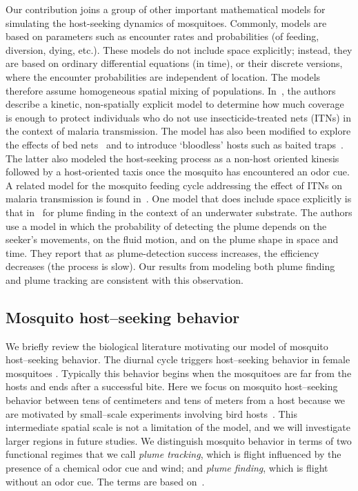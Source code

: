 \documentclass[10pt]{article}
\begin{document}
Our contribution joins a group of other important mathematical models for simulating the host-seeking dynamics of mosquitoes.  Commonly, models are based on parameters such as encounter rates and probabilities (of feeding, diversion, dying, etc.).  These models do not include space explicitly; instead, they are based on ordinary differential equations (in time), or their discrete versions, where the encounter probabilities are independent of location. The models therefore assume homogeneous spatial mixing of populations.
%
In~\cite{KilleenEtAl2007}, the authors describe a kinetic, non-spatially explicit model to determine how much coverage is enough to protect individuals who do not use insecticide-treated nets (ITNs) in the context of malaria transmission.  The model has also been modified to explore the effects of bed nets~\cite{Killeen2007} and to introduce `bloodless' hosts such as baited traps~\cite{OkumuModel2010}.  The latter also modeled the host-seeking process as a non-host oriented kinesis followed by a host-oriented taxis once the mosquito has encountered an odor cue.  A related model for the mosquito feeding cycle addressing the effect of ITNs on malaria transmission is found in~\cite{LeMenach}.   One model that does include space explicitly is that in~\cite{Pasternak2009} for plume finding in the context of an underwater substrate.  The authors use a model in which the probability of detecting the plume depends on the seeker's movements, on the fluid motion, and on the plume shape in space and time. They report that as plume-detection success increases, the efficiency decreases (the process is slow).  Our results from modeling both plume finding and plume tracking are consistent with this observation.

\subsection*{Mosquito host--seeking behavior}\label{sec:mosqbehav}
We briefly review the biological literature motivating our model of mosquito host--seeking behavior. The diurnal cycle triggers host--seeking behavior in female mosquitoes \cite{Gibson1999}. Typically this behavior begins when the mosquitoes are far from the hosts and ends after a successful bite.  Here we focus on mosquito host--seeking behavior between tens of centimeters and tens of meters from a host because we are motivated by small--scale experiments involving bird hosts~\cite{Foppa2011}.  
This intermediate spatial scale is not a limitation of the model, and we will investigate larger regions in future studies.  
We distinguish mosquito behavior in terms of two functional regimes that we  call 
\textit{plume tracking}, which is flight influenced by the presence of a chemical odor cue and wind; and \textit{plume finding}, which is flight without an odor cue.  The terms are based on~\cite{Pasternak2009}.
\end{document}
